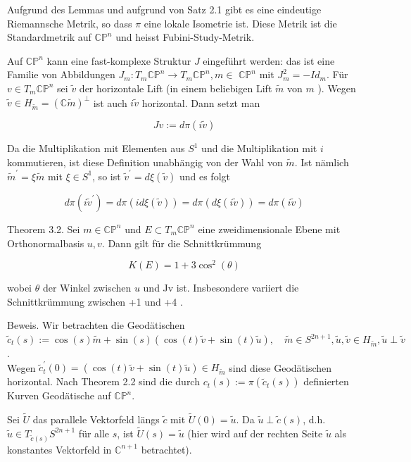 \documentclass[10pt]{article}
\begin{document}
Aufgrund des Lemmas und aufgrund von Satz 2.1 gibt es eine eindeutige Riemannsche Metrik, so dass $\pi$ eine lokale Isometrie ist. Diese Metrik ist die Standardmetrik auf $\mathbb{C P}^{n}$ und heisst Fubini-Study-Metrik.

Auf $\mathbb{C P}^{n}$ kann eine fast-komplexe Struktur $J$ eingeführt werden: das ist eine Familie von Abbildungen $J_{m}: T_{m} \mathbb{C P}^{n} \rightarrow T_{m} \mathbb{C P}^{n}, m \in$ $\mathbb{C P}^{n}$ mit $J_{m}^{2}=-I d_{m}$. Für $v \in T_{m} \mathbb{C P}^{n}$ sei $\tilde{v}$ der horizontale Lift (in einem beliebigen Lift $\tilde{m}$ von $m$ ). Wegen $\tilde{v} \in H_{\tilde{m}}=(\mathbb{C} \tilde{m})^{\perp}$ ist auch $i \tilde{v}$ horizontal. Dann setzt man

$$
J v:=d \pi(i \tilde{v})
$$

Da die Multiplikation mit Elementen aus $S^{1}$ und die Multiplikation mit $i$ kommutieren, ist diese Definition unabhängig von der Wahl von $\tilde{m}$. Ist nämlich $\tilde{m}^{\prime}=\xi \tilde{m}$ mit $\xi \in S^{1}$, so ist $\tilde{v}^{\prime}=d \xi(\tilde{v})$ und es folgt

$$
d \pi\left(i \tilde{v}^{\prime}\right)=d \pi(i d \xi(\tilde{v}))=d \pi(d \xi(i \tilde{v}))=d \pi(i \tilde{v})
$$

Theorem 3.2. Sei $m \in \mathbb{C P}^{n}$ und $E \subset T_{m} \mathbb{C P}^{n}$ eine zweidimensionale Ebene mit Orthonormalbasis $u, v$. Dann gilt für die Schnittkrümmung

$$
K(E)=1+3 \cos ^{2}(\theta)
$$

wobei $\theta$ der Winkel zwischen $u$ und Jv ist. Insbesondere variiert die Schnittkrümmung zwischen +1 und +4 .

Beweis. Wir betrachten die Geodätischen\\
$\tilde{c}_{t}(s):=\cos (s) \tilde{m}+\sin (s)(\cos (t) \tilde{v}+\sin (t) \tilde{u}), \quad \tilde{m} \in S^{2 n+1}, \tilde{u}, \tilde{v} \in H_{\tilde{m}}, \tilde{u} \perp \tilde{v}$.\\
Wegen $\tilde{c}_{t}^{\prime}(0)=(\cos (t) \tilde{v}+\sin (t) \tilde{u}) \in H_{\tilde{m}}$ sind diese Geodätischen horizontal. Nach Theorem 2.2 sind die durch $c_{t}(s):=\pi\left(\tilde{c}_{t}(s)\right)$ definierten Kurven Geodätische auf $\mathbb{C P}^{n}$.

Sei $\tilde{U}$ das parallele Vektorfeld längs $\tilde{c}$ mit $\tilde{U}(0)=\tilde{u}$. Da $\tilde{u} \perp \tilde{c}(s)$, d.h. $\tilde{u} \in T_{\tilde{c}(s)} S^{2 n+1}$ für alle $s$, ist $\tilde{U}(s)=\tilde{u}$ (hier wird auf der rechten Seite $\tilde{u}$ als konstantes Vektorfeld in $\mathbb{C}^{n+1}$ betrachtet).
\end{document}
